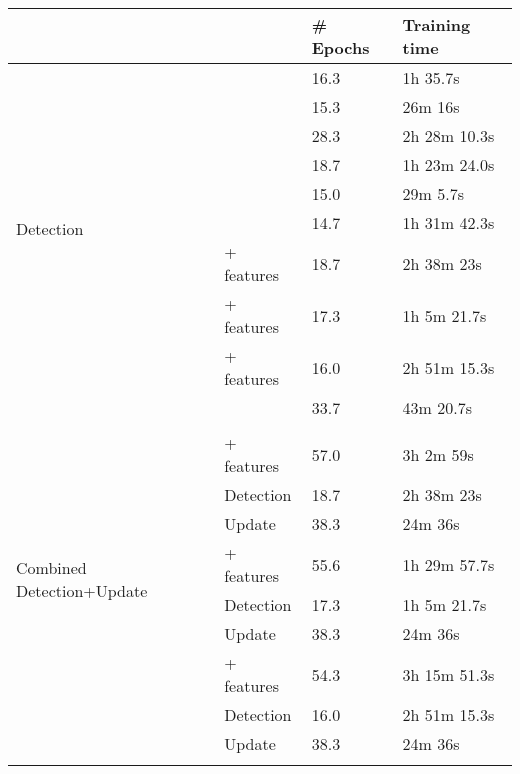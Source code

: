 \begin{table*}[t!]
\centering
\small
\begin{tabular}{ll@{\hskip 3mm}ll}
\hline
& & \bf \# Epochs & \bf Training time\\
\hline
\multirow{9}{*}{Detection}
& \PosthocSeq{} & 16.3 & 1h 35.7s \\
& \PosthocGraph{} & 15.3 & 26m 16s    \\
& \PosthocHybrid{} & 28.3 & 2h 28m 10.3s \\
\cline{2-4}
& \JustInTimeSeq{} & 18.7 & 1h 23m 24.0s  \\
& \JustInTimeGraph{} & 15.0 & 29m 5.7s   \\
& \JustInTimeHybrid{} & 14.7 & 1h 31m 42.3s  \\
\cline{2-4}
& \JustInTimeSeq{} + features & 18.7 & 2h 38m 23s \\
& \JustInTimeGraph{} + features & 17.3 & 1h 5m 21.7s  \\
& \JustInTimeHybrid{} + features & 16.0 &  2h 51m 15.3s  \\
\hline
\multirow{15}{*}{Combined Detection+Update}
& \UpdateCopy{} & 33.7 & 43m 20.7s  \\
\cline{2-4}
& \Pretrained{} &  &    \\
& \hspace{0.2cm}\JustInTimeSeq{} + features & 57.0 & 3h 2m 59s \\
& \hspace{0.6cm} Detection & 18.7 & 2h 38m 23s  \\
& \hspace{0.6cm} Update & 38.3 & 24m 36s \\
& \hspace{0.2cm}\JustInTimeGraph{} + features & 55.6  & 1h 29m 57.7s  \\
& \hspace{0.6cm} Detection & 17.3 & 1h 5m 21.7s  \\
& \hspace{0.6cm} Update & 38.3 & 24m 36s  \\
& \hspace{0.2cm}\JustInTimeHybrid{} + features & 54.3 & 3h 15m 51.3s \\
& \hspace{0.6cm}  Detection &  16.0 &  2h 51m 15.3s   \\
& \hspace{0.6cm} Update & 38.3 & 24m 36s   \\
\cline{2-4}
& \JointlyTrained{} &  &    \\

\end{tabular}
\end{table*}

